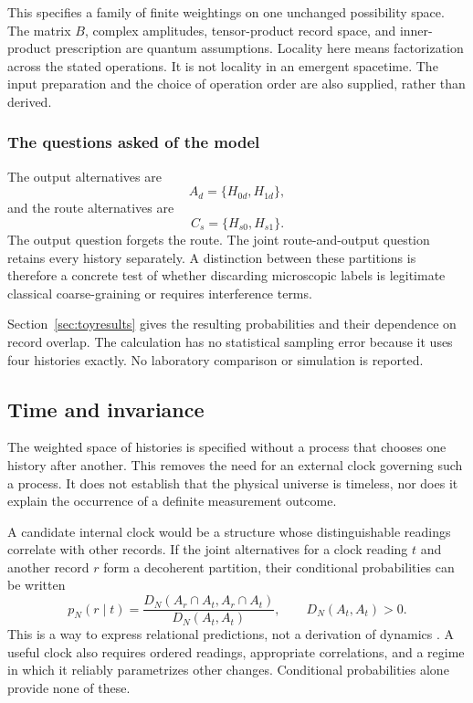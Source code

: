 This specifies a family of finite weightings on one unchanged possibility
space. The matrix $B$, complex amplitudes, tensor-product record space, and
inner-product prescription are quantum assumptions. Locality here means
factorization across the stated operations. It is not locality in an
emergent spacetime. The input preparation and the choice of operation order
are also supplied, rather than derived.

\subsubsection{The questions asked of the model}

The output alternatives are
\[
  A_d=\{H_{0d},H_{1d}\},
\]
and the route alternatives are
\[
  C_s=\{H_{s0},H_{s1}\}.
\]
The output question forgets the route. The joint route-and-output question
retains every history separately. A distinction between these partitions
is therefore a concrete test of whether discarding microscopic labels is
legitimate classical coarse-graining or requires interference terms.

Section~\ref{sec:toyresults} gives the resulting probabilities and their
dependence on record overlap. The calculation has no statistical sampling
error because it uses four histories exactly. No laboratory comparison or
simulation is reported.


\subsection{Time and invariance}
\label{sec:time}

The weighted space of histories is specified without a process that chooses
one history after another. This removes the need for an external clock
governing such a process. It does not establish that the physical universe
is timeless, nor does it explain the occurrence of a definite measurement
outcome.

A candidate internal clock would be a structure whose distinguishable
readings correlate with other records. If the joint alternatives for a
clock reading $t$ and another record $r$ form a decoherent partition, their
conditional probabilities can be written
\[
  p_N(r\mid t)
  =\frac{D_N(A_r\cap A_t,A_r\cap A_t)}{D_N(A_t,A_t)},
  \qquad D_N(A_t,A_t)>0.
\]
This is a way to express relational predictions, not a derivation of
dynamics \citep{page1983}. A useful clock also requires ordered readings,
appropriate correlations, and a regime in which it reliably parametrizes
other changes. Conditional probabilities alone provide none of these.

